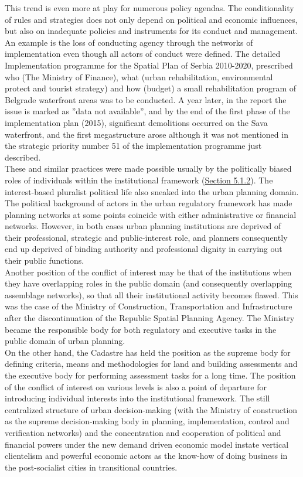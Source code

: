 \documentclass[11pt]{report}
\begin{document}
{{{{This trend is even more at play for numerous policy agendas.
The conditionality of rules and strategies does not only depend on political and economic influences, but also on inadequate policies and instruments for its conduct and management.
An example is the loss of conducting agency through the networks of implementation even though all actors of conduct were defined. The detailed Implementation programme for the Spatial Plan of Serbia 2010-2020, prescribed who (The Ministry of Finance), what (urban rehabilitation, environmental protect and tourist strategy) and how (budget) a small rehabilitation program of Belgrade waterfront areas was to be conducted. A year later, in the report the issue is marked as ”data not available”, and by the end of the first phase of the implementation plan (2015), significant demolitions occurred on the Sava waterfront, and the first megastructure arose although it was not mentioned in the strategic priority number 51 of the implementation programme just described.
\\

These and similar practices were made possible usually by the politically biased roles of individuals within the institutional framework (\href{Section 5.1.2}{Section 5.1.2}).
The interest-based pluralist political life also sneaked into the urban planning domain. The political background of actors in the urban regulatory framework has made planning networks at some points coincide with either administrative or financial networks. However, in both cases urban planning institutions are deprived of their professional, strategic and public-interest role, and planners consequently end up deprived of binding authority and professional dignity in carrying out their public functions.
\\

Another position of the conflict of interest may be that of the institutions when they have overlapping roles in the public domain (and consequently overlapping assemblage networks), so that all their institutional activity becomes flawed. This was the case of the Ministry of Construction, Transportation and Infrastructure after the discontinuation of the Republic Spatial Planning Agency. The Ministry became the responsible body for both regulatory and executive tasks in the public domain of urban planning.
\\

On the other hand, the Cadastre has held the position as the supreme body for defining criteria, means and methodologies for land and building assessments and the executive body for performing assessment tasks for a long time. The position of the conflict of interest on various levels is also a point of departure for introducing individual interests into the institutional framework. The still centralized structure of urban decision-making (with the Ministry of construction as the supreme decision-making body in planning, implementation, control and verification networks) and the concentration and cooperation of political and financial powers under the new demand driven economic model instate vertical clientelism and powerful economic actors as the know-how of doing business in the post-socialist cities in transitional countries.
\\

}}}}
\end{document}
